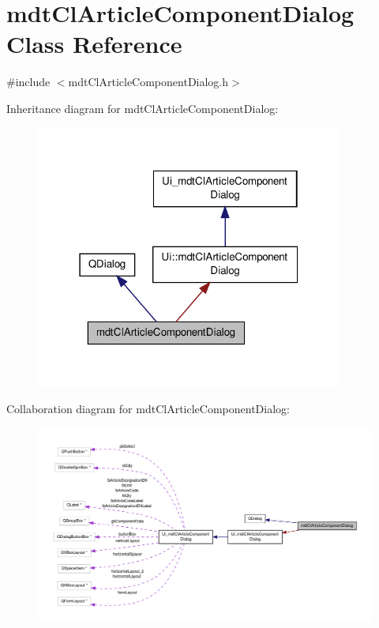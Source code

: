 \hypertarget{classmdt_cl_article_component_dialog}{\section{mdt\-Cl\-Article\-Component\-Dialog Class Reference}
\label{classmdt_cl_article_component_dialog}
}


{\ttfamily \#include $<$mdt\-Cl\-Article\-Component\-Dialog.\-h$>$}



Inheritance diagram for mdt\-Cl\-Article\-Component\-Dialog\-:\nopagebreak
\begin{figure}[H]
\begin{center}
\leavevmode
\includegraphics[width=286pt]{classmdt_cl_article_component_dialog__inherit__graph}
\end{center}
\end{figure}


Collaboration diagram for mdt\-Cl\-Article\-Component\-Dialog\-:\nopagebreak
\begin{figure}[H]
\begin{center}
\leavevmode
\includegraphics[width=350pt]{classmdt_cl_article_component_dialog__coll__graph}
\end{center}
\end{figure}

